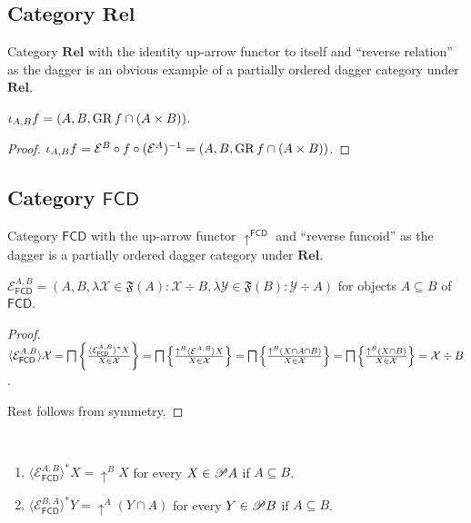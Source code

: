 \subsection{\texorpdfstring{Category $\mathbf{Rel}$}{Category Rel}}

Category $\mathbf{Rel}$ with the identity up-arrow functor to itself
and ``reverse relation'' as the dagger is an obvious example of a partially
ordered dagger category under $\mathbf{Rel}$.

\begin{prop}
  $\iota_{A, B} f = (A , B , \operatorname{GR} f \cap (A \times B))$.
\end{prop}

\begin{proof}
  $\iota_{A, B} f = \mathcal{E}^{B} \circ f \circ (\mathcal{E}^{A})^{-1} = (A , B , \operatorname{GR} f \cap (A \times B))$.
\end{proof}

\subsection{\texorpdfstring{Category $\mathsf{FCD}$}{Category FCD}}

Category $\mathsf{FCD}$ with the up-arrow functor
$\uparrow^{\mathsf{FCD}}$ and ``reverse funcoid'' as the dagger is a
partially ordered dagger category under $\mathbf{Rel}$.

\begin{prop}
  $\mathcal{E}_{\mathsf{FCD}}^{A,B} = (A , B , \lambda \mathcal{X}
  \in \mathfrak{F} (A) : \mathcal{X} \div B , \lambda \mathcal{Y} \in
  \mathfrak{F} (B) : \mathcal{Y} \div A)$ for objects $A \subseteq B$ of
  $\mathsf{FCD}$.
\end{prop}

\begin{proof}
  $\langle \mathcal{E}_{\mathsf{FCD}}^{A,B} \rangle \mathcal{X} =
  \bigsqcap \left\{ \frac{ \langle \mathcal{E}_{\mathsf{FCD}}^{A,B}
  \rangle^{\ast} X }{ X \in \mathcal{X} }\right\} =
  \bigsqcap \left\{ \frac{ \uparrow^B  \langle \mathcal{E}^{A,B} \rangle X
  }{ X \in \mathcal{X} }\right\} = \bigsqcap \left\{ \frac{
  \uparrow^B  (X \cap A \cap B) }{ X \in \mathcal{X}
  }\right\} = \bigsqcap \left\{ \frac{ \uparrow^B  (X \cap B) }{
  X \in \mathcal{X} }\right\} = \mathcal{X} \div B$.
  
  Rest follows from symmetry.
\end{proof}

\begin{prop}
  ~
  \begin{enumerate}
    \item $\langle \mathcal{E}_{\mathsf{FCD}}^{A,B} \rangle^{\ast} X
    = \uparrow^B X$ for every $X \in \mathscr{P} A$ if $A \subseteq B$.
    
    \item $\langle \mathcal{E}_{\mathsf{FCD}}^{B,A} \rangle^{\ast}
    Y = \uparrow^A (Y \cap A)$ for every $Y \in \mathscr{P} B$ if $A \subseteq
    B$.
  \end{enumerate}
\end{prop}

